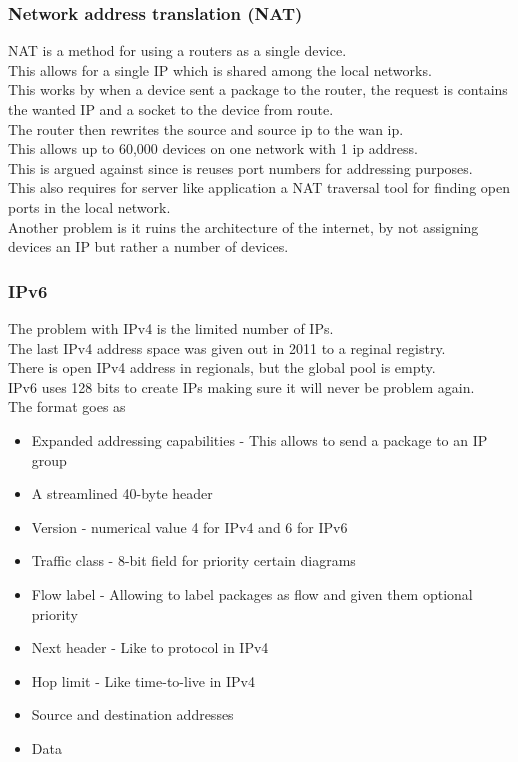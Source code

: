 \documentclass[12pt, a4paper]{article}
\begin{document}
			\subsubsection{Network address translation (NAT)}
				NAT is a method for using a routers as a single device.\\
				This allows for a single IP which is shared among the local networks.\\
				This works by when a device sent a package to the router, the request is contains the wanted IP and a socket to the device from route.\\
				The router then rewrites the source and source ip to the wan ip.\\
				This allows up to 60,000 devices on one network with 1 ip address.\\
				This is argued against since is reuses port numbers for addressing purposes.\\
				This also requires for server like application a NAT traversal tool for finding open ports in the local network.\\
				Another problem is it ruins the architecture of the internet, by not assigning devices an IP but rather a number of devices.\\
			\subsubsection{IPv6}
				The problem with IPv4 is the limited number of IPs.\\
				The last IPv4 address space was given out in 2011 to a reginal registry.\\
				There is open IPv4 address in regionals, but the global pool is empty.\\
				IPv6 uses 128 bits to create IPs making sure it will never be problem again.\\
				The format goes as
				\begin{itemize}
					\item Expanded addressing capabilities - This allows to send a package to an IP group 
					\item A streamlined 40-byte header 
					\item Version - numerical value 4 for IPv4 and 6 for IPv6
					\item Traffic class - 8-bit field for priority certain diagrams
					\item Flow label - Allowing to label packages as flow and given them optional priority
					\item Next header - Like to protocol in IPv4
					\item Hop limit - Like time-to-live in IPv4
					\item Source and destination addresses
					\item Data
				\end{itemize}
\end{document}
